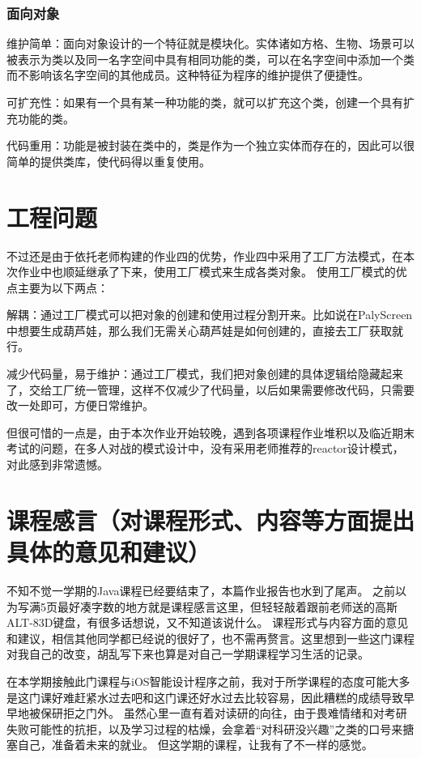 \documentclass{SCIS2022cn}
\begin{document}
\subsubsection{面向对象}

维护简单：面向对象设计的一个特征就是模块化。实体诸如方格、生物、场景可以被表示为类以及同一名字空间中具有相同功能的类，可以在名字空间中添加一个类而不影响该名字空间的其他成员。这种特征为程序的维护提供了便捷性。

可扩充性：如果有一个具有某一种功能的类，就可以扩充这个类，创建一个具有扩充功能的类。

代码重用：功能是被封装在类中的，类是作为一个独立实体而存在的，因此可以很简单的提供类库，使代码得以重复使用。

\section{工程问题}

不过还是由于依托老师构建的作业四的优势，作业四中采用了工厂方法模式，在本次作业中也顺延继承了下来，使用工厂模式来生成各类对象。
使用工厂模式的优点主要为以下两点：

解耦：通过工厂模式可以把对象的创建和使用过程分割开来。比如说在PalyScreen中想要生成葫芦娃，那么我们无需关心葫芦娃是如何创建的，直接去工厂获取就行。

减少代码量，易于维护：通过工厂模式，我们把对象创建的具体逻辑给隐藏起来了，交给工厂统一管理，这样不仅减少了代码量，以后如果需要修改代码，只需要改一处即可，方便日常维护。

但很可惜的一点是，由于本次作业开始较晚，遇到各项课程作业堆积以及临近期末考试的问题，在多人对战的模式设计中，没有采用老师推荐的reactor设计模式，对此感到非常遗憾。


\section{课程感言（对课程形式、内容等方面提出具体的意见和建议）}

不知不觉一学期的Java课程已经要结束了，本篇作业报告也水到了尾声。
之前以为写满5页最好凑字数的地方就是课程感言这里，但轻轻敲着跟前老师送的高斯ALT-83D键盘，有很多话想说，又不知道该说什么。
课程形式与内容方面的意见和建议，相信其他同学都已经说的很好了，也不需再赘言。这里想到一些这门课程对我自己的改变，胡乱写下来也算是对自己一学期课程学习生活的记录。

在本学期接触此门课程与iOS智能设计程序之前，我对于所学课程的态度可能大多是这门课好难赶紧水过去吧和这门课还好水过去比较容易，因此糟糕的成绩导致早早地被保研拒之门外。
虽然心里一直有着对读研的向往，由于畏难情绪和对考研失败可能性的抗拒，以及学习过程的枯燥，会拿着“对科研没兴趣”之类的口号来搪塞自己，准备着未来的就业。
但这学期的课程，让我有了不一样的感觉。
\end{document}
